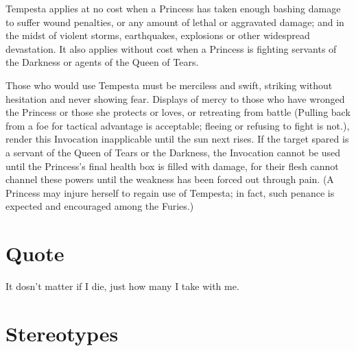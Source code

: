 Tempesta applies at no cost when a Princess has taken enough bashing damage to suffer wound penalties, or any amount of lethal or aggravated damage; and in the midst of violent storms, earthquakes, explosions or other widespread devastation. It also applies without cost when a Princess is fighting servants of the Darkness or agents of the Queen of Tears.

Those who would use Tempesta must be merciless and swift, striking without hesitation and never showing fear. Displays of mercy to those who have wronged the Princess or those she protects or loves, or retreating from battle (Pulling back from a foe for tactical advantage is acceptable; fleeing or refusing to fight is not.), render this Invocation inapplicable until the sun next rises. If the target spared is a servant of the Queen of Tears or the Darkness, the Invocation cannot be used until the Princess's final health box is filled with damage, for their flesh cannot channel these powers until the weakness has been forced out through pain. (A Princess may injure herself to regain use of Tempesta; in fact, such penance is expected and encouraged among the Furies.) 

\section*{Quote}

It dosn't matter if I die, just how many I take with me. 

\section*{Stereotypes}

